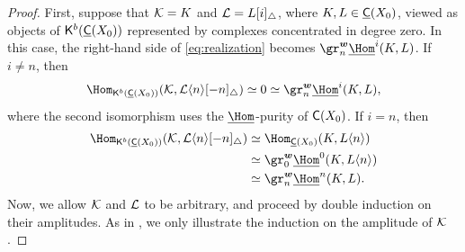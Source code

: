 \documentclass[a4paper,10pt,leqno]{amsart}
\theoremstyle{plain}
\theoremstyle{plain}
\theoremstyle{plain}
\theoremstyle{definition}
\theoremstyle{remark}
\begin{document}
\begin{proof}
First, suppose that $\cal{K} = K$ and $\cal{L} = L[i]_\triangle$, where $K, L \in \underline{\sf{C}}(X_0)$, viewed as objects of $\sf{K}^b(\underline{\sf{C}}(X_0))$ represented by complexes concentrated in degree zero.
In this case, the right-hand side of \eqref{eq:realization} becomes $\gr_n^{\bm{w}} \SHom^i(K, L)$.
If $i \neq n$, then
\begin{align}
\Hom_{\sf{K}^b(\underline{\sf{C}}(X_0))}(\cal{K}, \cal{L}\langle n\rangle [-n]_\triangle)
\simeq 0 \simeq \gr_n^{\bm{w}} \SHom^i(K, L),
\end{align}
where the second isomorphism uses the $\SHom$-purity of $\sf{C}(X_0)$.
If $i = n$, then 
\begin{align}\begin{split}
\Hom_{\sf{K}^b(\underline{\sf{C}}(X_0))}(\cal{K}, \cal{L}\langle n\rangle [-n]_\triangle)
&\simeq 	\Hom_{\underline{\sf{C}}(X_0)}(K, L\langle n\rangle)\\
&\simeq		\gr_0^{\bm{w}} \SHom^0(K, L\langle n\rangle)\\
&\simeq		\gr_n^{\bm{w}} \SHom^n(K, L).
\end{split}\end{align}
Now, we allow $\cal{K}$ and $\cal{L}$ to be arbitrary, and proceed by double induction on their amplitudes.
As in \cite{rider}, we only illustrate the induction on the amplitude of $\cal{K}$.


\end{proof}
\end{document}
